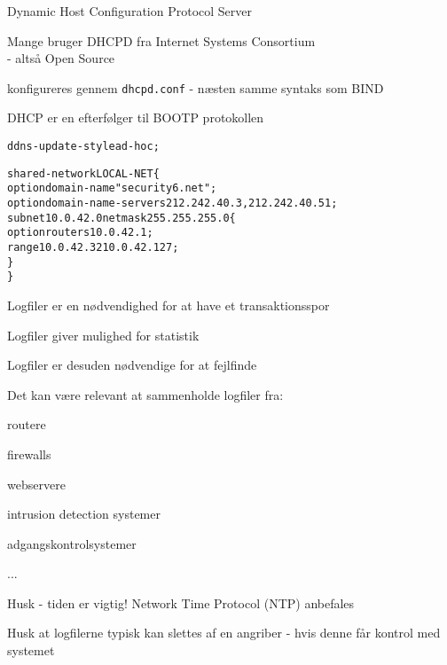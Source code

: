 
\begin{list1}
\item Dynamic Host Configuration Protocol Server
\item Mange bruger DHCPD fra Internet Systems Consortium\\
   - altså Open Source
\item konfigureres gennem \verb+dhcpd.conf+ - næsten samme syntaks som BIND 
\item DHCP er en efterfølger til BOOTP protokollen
\end{list1}

\begin{alltt}
\small
ddns-update-style ad-hoc;

shared-network LOCAL-NET \{
    option  domain-name "security6.net";
    option  domain-name-servers 212.242.40.3, 212.242.40.51;
    subnet 10.0.42.0 netmask 255.255.255.0 \{
            option routers 10.0.42.1;
            range 10.0.42.32 10.0.42.127;
    \}
\}  
\end{alltt}






\begin{list1}
\item Logfiler er en nødvendighed for at have et transaktionsspor
\item Logfiler giver mulighed for statistik
\item Logfiler er desuden nødvendige for at fejlfinde
\item Det kan være relevant at sammenholde logfiler fra:  
\begin{list2}
\item routere
\item firewalls
\item webservere
\item intrusion detection systemer
\item adgangskontrolsystemer
\item ...
\end{list2}
\item Husk - tiden er vigtig! Network Time Protocol (NTP) anbefales 
\item Husk at logfilerne typisk kan slettes af en angriber -
  hvis denne får kontrol med systemet
\end{list1}


